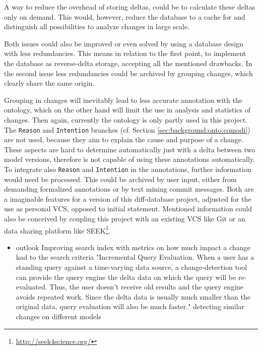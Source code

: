 A way to reduce the overhead of storing deltas, could be to calculate these deltas only on demand. This would, however, reduce the database to a cache for \bives and distinguish all possibilities to analyze changes in large scale.

Both issues could also be improved or even solved by using a database design with less redundancies. This means in relation to the first point, to implement the database as reverse-delta storage, accepting all the mentioned drawbacks.
In the second issue less redundancies could be archived by grouping changes, which clearly share the same origin.

Grouping in changes will inevitably lead to less accurate annotation with the \comodi ontology, which on the other hand will limit the use in analysis and statistics of changes. 
Then again, currently the \comodi ontology is only partly used in this project. The \texttt{Reason} and \texttt{Intention} branches (cf. Section \ref{sec:background:onto:comodi}) are not used, because they aim to explain the cause and purpose of a change. These aspects are hard to determine automatically just with a delta between two model versions, therefore is \bives not capable of using these annotations automatically.
To integrate also \texttt{Reason} and \texttt{Intention} in the annotations, further information would need be processed. This could be archived by user input, either from demanding formalized annotations or by text mining commit messages. 
Both are a imaginable features for a version of this diff-database project, adjusted for the use as personal VCS, opposed to initial statement.
Mentioned information could also be conceived by coupling this project with an existing VCS like Git or an data sharing platform like SEEK\footnote{\url{http://seek4science.org/}}.

\begin{itemize}
	\item outlook
	\subitem Improving search index with metrics on how much impact a change had to the search criteria
	\subsubitem "Incremental Query Evaluation. When a user has a standing query against a time-varying data source, a change-detection tool can provide the query engine the delta data on which the query will be re-evaluated. Thus, the user doesn’t receive old results and the query engine avoids repeated work. Since the delta data is usually much smaller than the original data, query evaluation will also be much faster." \citep{Wang2003}
	\subitem detecting similar changes on different models
\end{itemize}

